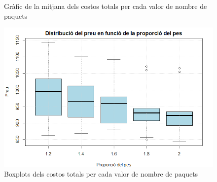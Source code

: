 \documentclass[a4paper]{article}
\begin{document}
\begin{table}[ht]
\begin{figure}[H]
\begin{minipage}{0.45\textwidth}
			\caption{Gràfic de la mitjana dels costos totals per cada valor de nombre de paquets}
			\label{fig:exp5_grafic_lineal}
		\end{minipage}\hfill
		\begin{minipage}{0.45\textwidth}
			\centering
			\includegraphics[width=\textwidth]{images/exp5_boxplot.png}
			\caption{Boxplots dels costos totals per cada valor de nombre de paquets}
			\label{fig:exp5_boxplot}
		\end{minipage}
	\end{figure}
	

\end{table}
\end{document}

